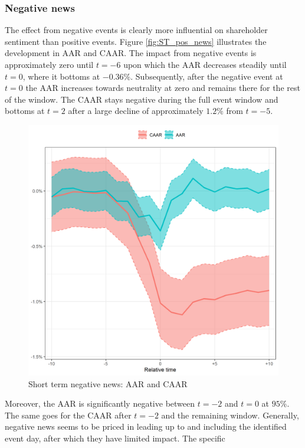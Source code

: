 \subsubsection{Negative news}

The effect from negative events is clearly more influential on shareholder sentiment than positive events. Figure \ref{fig:ST_pos_news} illustrates the development in AAR and CAAR. The impact from negative events is approximately zero until $t = -6$ upon which the AAR decreases steadily until $t=0$, where it bottoms at $-0.36\%$. Subsequently, after the negative event at $t=0$ the AAR increases towards neutrality at zero and remains there for the rest of the window. The CAAR stays negative during the full event window and bottoms at $t=2$ after a large decline of approximately $1.2\%$ from  $t=-5$.  
\begin{figure} [H]
    \centering
    \includegraphics[scale=0.6]{Projekt/1.Figures analysis/ST_negative_all_CI.png}
    \caption{Short term negative news: AAR and CAAR}
    \label{fig:ST_neg_news}
\end{figure}
Moreover, the AAR is significantly negative between $t=-2$ and $t=0$ at $95\%$. The same goes for the CAAR after $t=-2$ and the remaining window. Generally, negative news seems to be priced in leading up to and including the identified event day, after which they have limited impact. 
The specific 


